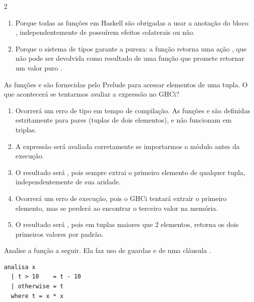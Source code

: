 \documentclass[a4paper,10pt,brazil]{article}
\begin{document}
\begin{multicols}{2}
\begin{enumerate}
  \item Porque todas as funções em Haskell são obrigadas a usar a anotação do bloco , independentemente de possuírem efeitos colaterais ou não.

  \item Porque o sistema de tipos garante a pureza: a função  retorna uma ação , que não pode ser devolvida como resultado de uma função que promete retornar um valor puro .


\end{enumerate}

As funções  e  são fornecidas pelo Prelude para acessar elementos de uma tupla. O que acontecerá se tentarmos avaliar a expressão  no GHCi?

\begin{enumerate}
  \item Ocorrerá um erro de tipo em tempo de compilação. As funções  e  são definidas estritamente para pares (tuplas de dois elementos), e não funcionam em triplas.

  \item A expressão será avaliada corretamente se importarmos o módulo  antes da execução.

  \item O resultado será , pois  sempre extrai o primeiro elemento de qualquer tupla, independentemente de sua aridade.

  \item Ocorrerá um erro de execução, pois o GHCi tentará extrair o primeiro elemento, mas se perderá ao encontrar o terceiro valor na memória.

  \item O resultado será , pois em tuplas maiores que 2 elementos,  retorna os dois primeiros valores por padrão.


\end{enumerate}

Analise a função a seguir. Ela faz uso de guardas e de uma cláusula .

\begin{verbatim}
analisa x
  | t > 10    = t - 10
  | otherwise = t
  where t = x * x
\end{verbatim}


\end{multicols}
\end{document}
